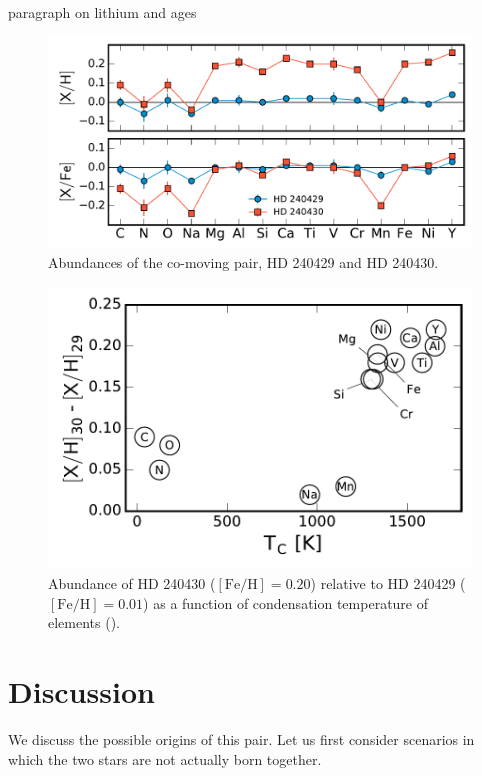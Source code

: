 \documentclass[manuscript]{aastex6}
\begin{document}
paragraph on lithium and ages

\begin{figure}[htpb]
  \centering
  \includegraphics[width=0.9\linewidth]{abundances.pdf}
  \caption{Abundances of the co-moving pair, HD 240429 and HD 240430.}
  \label{fig:abundances}
\end{figure}

\begin{figure}[htpb]
  \centering
  \includegraphics[width=0.9\linewidth]{relabun_tc_XH.pdf}
  \caption{Abundance of HD 240430 ($[\mathrm{Fe}/\mathrm{H}] = 0.20$)
    relative to HD 240429 ($[\mathrm{Fe}/\mathrm{H}] = 0.01$)
    as a function of condensation temperature of elements (\citealt{2003ApJ...591.1220L}).
  }
  \label{fig:relabun_tc}
\end{figure}

\section{Discussion}
\label{sec:discussion}

We discuss the possible origins of this pair.
Let us first consider scenarios in which the two stars are not actually born together.
\end{document}
